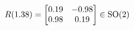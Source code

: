 \documentclass[preview]{standalone}
\begin{document}
\begin{align*}
\special{dvisvgm:raw <g id='unique000'>}R(1.38) = \begin{bmatrix} 0.19 & -0.98 \\ 0.98 & 0.19 \end{bmatrix} \in \text{SO}(2)\special{dvisvgm:raw </g>}
\end{align*}
\end{document}
